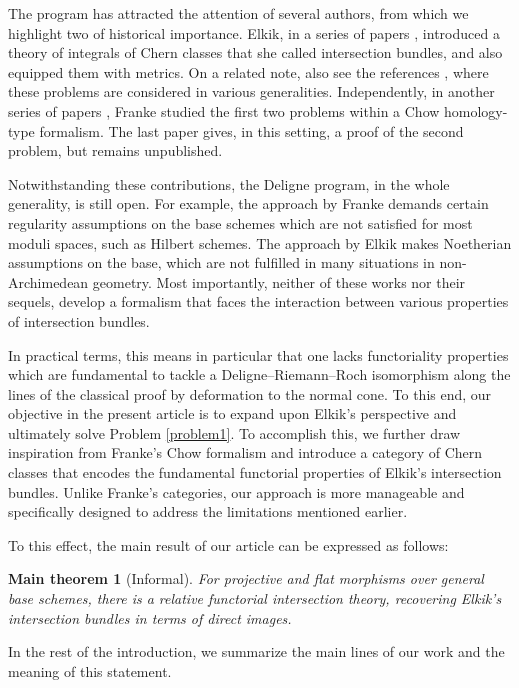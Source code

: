 \documentclass[JEP,XML,SOM,Unicode,published]{cedram}
\theoremstyle{plain}
\newtheorem*{theoremMeta}{Main theorem}
\theoremstyle{definition}
\begin{document}
The program has attracted the attention of several authors, from which we highlight two of historical importance. Elkik, in a series of papers \cite{Elkikfib, Elkikmetr}, introduced a theory of integrals of Chern classes that she called intersection bundles, and also equipped them with metrics. On a related note, also see the references \cite{Boucksom-Eriksson, Ducrot, Munoz}, where these problems are considered in various generalities. Independently, in another series of papers \cite{FrankeChow, FrankeChern, Franke}, Franke studied the first two problems within a Chow homology-type formalism. The last paper gives, in this setting, a proof of the second problem, but remains unpublished.

Notwithstanding these contributions, the Deligne program, in the whole generality, is still open. For example, the approach by Franke demands certain regularity assumptions on the base schemes which are not satisfied for most moduli spaces, such as Hilbert schemes. The approach by Elkik makes Noetherian assumptions on the base, which are not fulfilled in many situations in non-Archimedean geometry. Most importantly, neither of these works nor their sequels, develop a formalism that faces the interaction between various properties of intersection bundles.

In practical terms, this means in particular that one lacks functoriality properties which are fundamental to tackle a Deligne--Riemann--Roch isomorphism along the lines of the classical proof by deformation to the normal cone. To this end, our objective in the present article is to expand upon Elkik's perspective and ultimately solve Problem \ref{problem1}. To accomplish this, we further draw inspiration from Franke's Chow formalism and introduce a category of
Chern classes that encodes the fundamental functorial properties of Elkik's intersection bundles. Unlike Franke's categories, our approach is more manageable and specifically designed to address the limitations mentioned earlier.

To this effect, the main result of our article can be expressed as follows:

\begin{theoremMeta} [Informal]
For projective and flat morphisms over general base schemes, there is a relative functorial intersection theory, recovering Elkik's intersection bundles in terms of direct images.
\end{theoremMeta}

In the rest of the introduction, we summarize the main lines of our work and the meaning of this statement.
\end{document}
